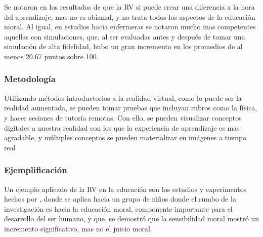 Se notaron en los resultados de \cite{SHIM2023100010} que la RV si puede crear una diferencia a la hora del aprendizaje, mas no es abismal, y no trata todos los aspectos de la educación moral. Al igual, en estudios hacia enfermeras se notaron mucho mas competentes aquellas con simulaciones, que, al ser evaluadas antes y después de tomar una simulación de alta fidelidad, hubo un gran incremento en los promedios de al menos 20.67 puntos sobre 100. \parencite{GUERRERO2022100002}

\subsubsection{Metodología}
Utilizando métodos introductorios a la realidad virtual, como lo puede ser la realidad aumentada, se pueden tomar pruebas que incluyan rubros como la física, y hacer sesiones de tutoría remotas. Con ello, se pueden visualizar conceptos digitales a nuestra realidad con los que la experiencia de aprendizaje es mas agradable, y múltiples conceptos se pueden materializar en imágenes a tiempo real \parencite{RADU2023100011}



\subsubsection{Ejemplificación}

Un ejemplo aplicado de la RV en la educación son los estudios y experimentos hechos por \parencite{SHIM2023100010}, donde se aplica hacia un grupo de niños donde el rumbo de la investigación es hacia la educación moral, componente importante para el desarrollo del ser humano, y que, se demostró que la sensibilidad moral mostró un incremento significativo, mas no el juicio moral.
